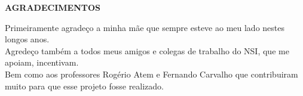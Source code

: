 \begin{center}
\textbf{AGRADECIMENTOS}
\end{center}

Primeiramente agradeço a minha mãe que sempre esteve ao meu lado nestes longos anos. \\
Agredeço também a todos meus amigos e colegas de trabalho do NSI, que me apoiam, incentivam. \\
Bem como aos professores Rogério Atem e Fernando Carvalho que contribuiram muito para que esse projeto fosse realizado.